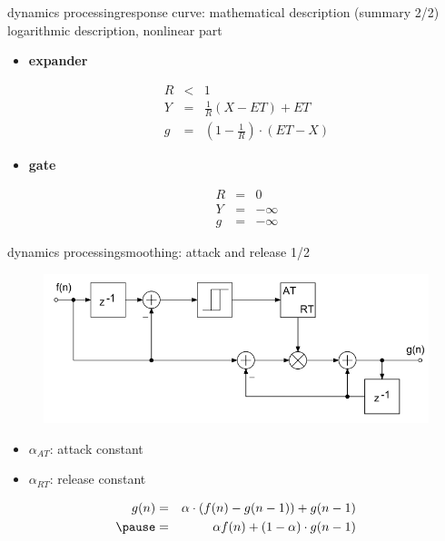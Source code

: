 \begin{frame}{dynamics processing}{response curve: mathematical description (summary 2/2)}
	\vspace{-5mm}
    logarithmic description, nonlinear part
    \bigskip
	\begin{itemize}
		\item	\textbf{expander}
			\begin{footnotesize}\begin{eqnarray*}
				R &<& 1\\
				Y &=& \frac{1}{R}\left(X-ET\right) + ET\\
				g &=& \left(1-\frac{1}{R}\right)\cdot (ET-X)
			\end{eqnarray*}\end{footnotesize}
		\pause
		\item	\textbf{gate}
			\begin{footnotesize}\begin{eqnarray*}
				R &=& 0\\
				Y &=& -\infty\\
				g &=& -\infty
			\end{eqnarray*}\end{footnotesize}
	\end{itemize}
\end{frame}

\begin{frame}{dynamics processing}{smoothing: attack and release 1/2}
	\begin{figure}
		\centering
			\includegraphics[scale=.5]{graph/smooth_control}
	\end{figure}
	\begin{itemize}
		\item	$\alpha_{AT}$: attack constant
		\item	$\alpha_{RT}$: release constant
	\end{itemize}
	
	\pause
	\begin{eqnarray*}
		g(n) &=& \alpha\cdot(f(n)-g(n-1)) + g(n-1)\nonumber\\
		\pause
			&=& \alpha f(n) + (1-\alpha)\cdot g(n-1)
	\end{eqnarray*}
\end{frame}

